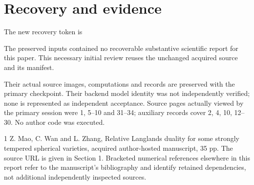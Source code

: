 \documentclass[10pt]{article}
\begin{document}
\section*{Recovery and evidence}
The new recovery token is\par
The preserved inputs contained no recoverable substantive scientific report for this paper. This necessary initial review reuses the unchanged acquired source and its manifest.\par
Their actual source images, computations and records are preserved with the primary checkpoint. Their backend model identity was not independently verified; none is represented as independent acceptance. Source pages actually viewed by the primary session were 1, 5–10 and 31–34; auxiliary records cover 2, 4, 10, 12–30. No author code was executed.\par
1 Z. Mao, C. Wan and L. Zhang, Relative Langlands duality for some strongly tempered spherical varieties, acquired author-hosted manuscript, 35 pp. The source URL is given in Section 1. Bracketed numerical references elsewhere in this report refer to the manuscript’s bibliography and identify retained dependencies, not additional independently inspected sources.\par
\end{document}
